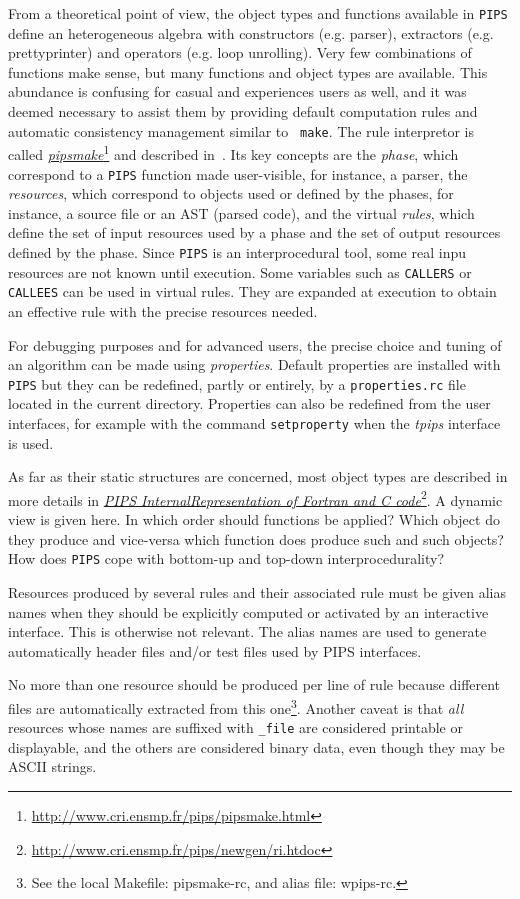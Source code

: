 \documentclass[a4paper]{report}
\newcommand{\LINK}[2]{\href{#2}{#1}\footnote{\url{#2}}\xspace}
\newcommand{\Pips}{\texttt{PIPS}}
\newcommand{\PIPSMAKE}{\LINK{\emph{pipsmake}}{http://www.cri.ensmp.fr/pips/pipsmake.html}\xspace}
\newcommand{\PROPERTIES}{{\em properties}}
\newcommand{\Pri}{\LINK{\emph{PIPS Internal\space{}Representation of
      Fortran and C code}}{http://www.cri.ensmp.fr/pips/newgen/ri.htdoc}}
\newcommand{\Tpips}{{\em tpips}}
\begin{document}
From a theoretical point of view, the object types and functions
available in {\tt PIPS} define an heterogeneous algebra with
constructors (e.g. parser), extractors (e.g. prettyprinter) and
operators (e.g. loop unrolling).  Very few combinations of functions
make sense, but many functions and object types are available. This
abundance is confusing for casual and experiences users as well, and
it was deemed necessary to assist them by providing default
computation rules and automatic consistency management similar to {\tt
  make}. The rule interpretor is called \PIPSMAKE{} and described
in~\cite{Bar91}. Its key concepts are the {\em phase}, which correspond
to a \Pips{} function made user-visible, for instance, a parser, the
{\em resources}, which correspond to objects used or defined by the
phases, for instance, a source file or an AST (parsed code), and the
virtual {\em rules}, which define the set of input resources used by a
phase and the set of output resources defined by the phase. Since
\Pips{} is an interprocedural tool, some real inpu resources are not
known until execution. Some variables such as \verb/CALLERS/ or
\verb/CALLEES/ can be used in virtual rules. They are expanded at
execution to obtain an effective rule with the precise resources needed.

For debugging purposes and for advanced users, the precise choice and
tuning of an algorithm can be made using \PROPERTIES{}. Default
properties are installed with \Pips{} but they can be redefined,
partly or entirely, by a {\tt properties.rc} file located in the
current directory. Properties can also be redefined from the user
interfaces, for example with the command \texttt{setproperty} when the
\Tpips{} interface is used.

As far as their static structures are concerned, most object types are
described in more details in \Pri. A dynamic view is given here. In
which order should functions be applied?  Which object do they produce
and vice-versa which function does produce such and such objects? How
does \Pips{} cope with bottom-up and top-down interprocedurality?

Resources produced by several rules and their associated rule must be
given alias names when they should be explicitly computed or activated
by an interactive interface. This
is otherwise not relevant. The alias names are used to generate
automatically header files and/or test files used by PIPS interfaces.

No more than one resource should be produced per line of rule because
different files are automatically extracted from this one\footnote{See
the local Makefile: pipsmake-rc, and alias file: wpips-rc.}. Another
caveat is that \emph{all} resources whose names are suffixed with
\verb|_file| are considered printable or displayable, and the others
are considered binary data, even though they may be ASCII strings.
\end{document}
